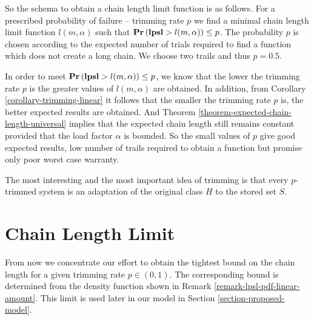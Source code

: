 So the schema to obtain a chain length limit function is as follows. For a prescribed probability of failure -- trimming rate $p$ we find a minimal chain length limit function $l(m, \alpha)$ such that $\mathbf{Pr}\left(\mathbf{lpsl} > l(m, \alpha)\right) \leq p$. The probability $p$ is chosen according to the expected number of trials required to find a function which does not create a long chain. We choose two trails and thus $p = 0.5$.

In order to meet $\mathbf{Pr}\left(\mathbf{lpsl} > l(m, \alpha)\right) \leq p$, we know that the lower the trimming rate $p$ is the greater values of $l(m, \alpha)$ are obtained. In addition, from Corollary \ref{corollary-trimming-linear} it follows that the smaller the trimming rate $p$ is, the better expected results are obtained. And Theorem \ref{theorem-expected-chain-length-universal} implies that the expected chain length still remains constant provided that the load factor $\alpha$ is bounded. So the small values of $p$ give good expected results, low number of trails required to obtain a function but promise only poor worst case warranty.

The most interesting and the most important idea of trimming is that every $p$-trimmed system is an adaptation of the original class $H$ to the stored set $S$.

\section{Chain Length Limit}
\label{section-linear-systems-linear-amount-constant-estimate}
From now we concentrate our effort to obtain the tightest bound on the chain length for a given trimming rate $p \in (0, 1)$. The corresponding bound is determined from the density function shown in Remark \ref{remark-lpsl-pdf-linear-amount}. This limit is used later in our model in Section \ref{section-proposed-model}.

